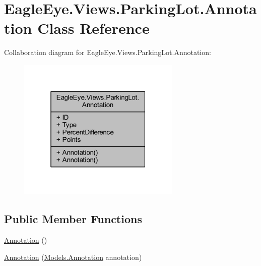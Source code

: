 \hypertarget{class_eagle_eye_1_1_views_1_1_parking_lot_1_1_annotation}{}\section{Eagle\+Eye.\+Views.\+Parking\+Lot.\+Annotation Class Reference}
\label{class_eagle_eye_1_1_views_1_1_parking_lot_1_1_annotation}


Collaboration diagram for Eagle\+Eye.\+Views.\+Parking\+Lot.\+Annotation\+:\nopagebreak
\begin{figure}[H]
\begin{center}
\leavevmode
\includegraphics[width=220pt]{class_eagle_eye_1_1_views_1_1_parking_lot_1_1_annotation__coll__graph}
\end{center}
\end{figure}
\subsection*{Public Member Functions}
\begin{DoxyCompactItemize}
\item 
\mbox{\hyperlink{class_eagle_eye_1_1_views_1_1_parking_lot_1_1_annotation_a219a85017ab1fb54045c686bd49e2e32}{Annotation}} ()
\item 
\mbox{\hyperlink{class_eagle_eye_1_1_views_1_1_parking_lot_1_1_annotation_a49916dc64f4e7e0a7ab9883c68abf103}{Annotation}} (\mbox{\hyperlink{class_eagle_eye_1_1_models_1_1_annotation}{Models.\+Annotation}} annotation)
\end{DoxyCompactItemize}
